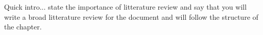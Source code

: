 \chapter{\chapzerotitle}

Quick intro... state the importance of litterature review and say that you will write a broad litterature review for the document and will follow the structure of the chapter. 

\section{\chaponetitle}
\label{sec:chap1_litterature_review_1}

\section{\chaptwotitle}
\label{sec:chap1_litterature_review_2}

\section{\chapthreetitle}
\label{sec:chap1_litterature_review_3}

